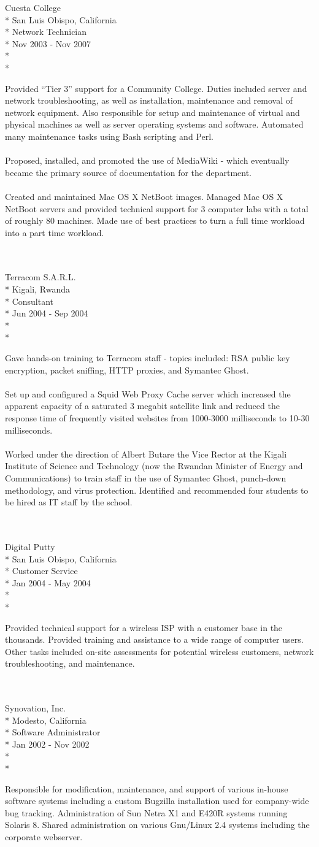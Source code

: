 \documentclass[10pt]{article}
\newcommand{\work}[5]{ 
#1\\*
#3\\*
#4\\*
#2\\*
\\*
\makebox[1in][l]{}
\begin{minipage}[t]{5.50in}\small{#5}\end{minipage}
\\
\\
}
\begin{document}
\newpage 

\work{Cuesta College}{Nov 2003 - Nov 2007}{San Luis Obispo, California}{Network Technician}{
Provided ``Tier 3'' support for a Community College. 
Duties included server and network troubleshooting, 
as well as installation, maintenance and removal of network equipment.
Also responsible for setup and maintenance of virtual and physical machines as well as server operating systems and software.  
Automated many maintenance tasks using Bash scripting and Perl.
\\
\\ 
Proposed, installed, and promoted the use of MediaWiki - which eventually became the primary source of documentation for the department.
\\
\\
Created and maintained Mac OS X NetBoot images. Managed Mac OS X NetBoot servers and provided technical support for 3 computer labs with a total of roughly 80 machines. Made use of best practices to turn a full time workload into a part time workload.
}

\work{Terracom S.A.R.L.}{Jun 2004 - Sep 2004}{Kigali, Rwanda}{Consultant}{
Gave hands-on training to Terracom staff - topics included: RSA public key encryption, packet sniffing, HTTP proxies, and Symantec Ghost.
\\
\\
Set up and configured a Squid Web Proxy Cache server which increased the apparent capacity of a saturated 3 megabit satellite link and reduced the response time of frequently visited websites from 1000-3000 milliseconds to 10-30 milliseconds.
\\
\\
Worked under the direction of
Albert Butare the Vice Rector at the Kigali Institute of Science and Technology
(now the Rwandan Minister of Energy and Communications) 
to train staff in the use of Symantec Ghost, punch-down methodology, and virus protection. 
Identified and recommended four students to be hired as IT staff by the school.
}

\work{Digital Putty}{Jan 2004 - May 2004}{San Luis Obispo, California}{Customer Service}{
Provided technical support for a wireless ISP with a customer base in the thousands. 
Provided training and assistance to a wide range of computer users. 
Other tasks included on-site assessments for potential wireless customers, network troubleshooting, and maintenance.
}

\work{Synovation, Inc.}{Jan 2002 - Nov 2002}{Modesto, California}{Software Administrator}{
Responsible for modification, maintenance, and support of various in-house software systems 
including a custom Bugzilla installation used for company-wide bug tracking. 
Administration of Sun Netra X1 and E420R systems running Solaris 8. 
Shared administration on various Gnu/Linux 2.4 systems including the corporate webserver.
}

\end{document}
